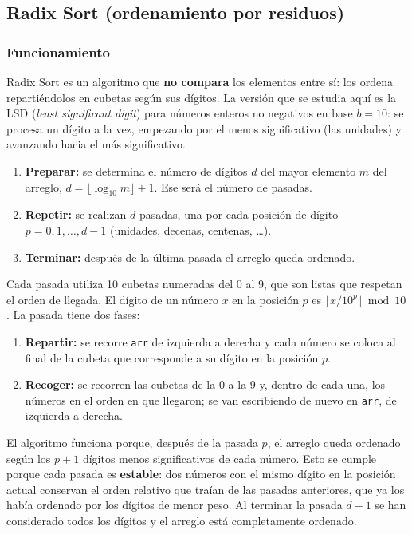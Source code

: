 \documentclass[11pt,letterpaper]{article}
\begin{document}
\subsection{Radix Sort (ordenamiento por residuos)}
\subsubsection{Funcionamiento}

Radix Sort es un algoritmo que \textbf{no compara} los elementos entre sí: los ordena repartiéndolos en cubetas según sus dígitos. La versión que se estudia aquí es la LSD (\emph{least significant digit}) para números enteros no negativos en base $b = 10$: se procesa un dígito a la vez, empezando por el menos significativo (las unidades) y avanzando hacia el más significativo.

\begin{enumerate}
  \item \textbf{Preparar:} se determina el número de dígitos $d$ del mayor elemento $m$ del arreglo, $d = \lfloor \log_{10} m \rfloor + 1$. Ese será el número de pasadas.
  \item \textbf{Repetir:} se realizan $d$ pasadas, una por cada posición de dígito $p = 0, 1, \dots, d-1$ (unidades, decenas, centenas, \dots).
  \item \textbf{Terminar:} después de la última pasada el arreglo queda ordenado.
\end{enumerate}

Cada pasada utiliza 10 cubetas numeradas del 0 al 9, que son listas que respetan el orden de llegada. El dígito de un número $x$ en la posición $p$ es $\lfloor x / 10^{p} \rfloor \bmod 10$. La pasada tiene dos fases:

\begin{enumerate}
  \item \textbf{Repartir:} se recorre \texttt{arr} de izquierda a derecha y cada número se coloca al final de la cubeta que corresponde a su dígito en la posición $p$.
  \item \textbf{Recoger:} se recorren las cubetas de la 0 a la 9 y, dentro de cada una, los números en el orden en que llegaron; se van escribiendo de nuevo en \texttt{arr}, de izquierda a derecha.
\end{enumerate}

El algoritmo funciona porque, después de la pasada $p$, el arreglo queda ordenado según los $p + 1$ dígitos menos significativos de cada número. Esto se cumple porque cada pasada es \textbf{estable}: dos números con el mismo dígito en la posición actual conservan el orden relativo que traían de las pasadas anteriores, que ya los había ordenado por los dígitos de menor peso. Al terminar la pasada $d - 1$ se han considerado todos los dígitos y el arreglo está completamente ordenado.
\end{document}
